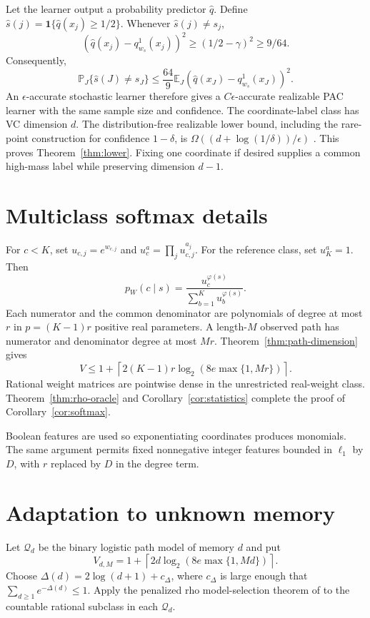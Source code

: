 \documentclass{article}
\theoremstyle{definition}
\theoremstyle{remark}
\newcommand{\E}{\mathbb E}
\newcommand{\Pp}{\mathbb P}
\newcommand{\cQ}{\mathcal Q}
\begin{document}
Let the learner output a probability predictor $\widehat q$. Define $\widehat s(j)=\mathbf 1\{\widehat q(x_j)\ge1/2\}$. Whenever $\widehat s(j)\ne s_j$,
\[
(\widehat q(x_j)-q_{w_s}^1(x_j))^2
\ge(1/2-\gamma)^2\ge9/64.
\]
Consequently,
\[
\Pp_J\{\widehat s(J)\ne s_J\}
\le\frac{64}{9}\E_J(\widehat q(x_J)-q_{w_s}^1(x_J))^2.
\]
An $\epsilon$-accurate stochastic learner therefore gives a $C\epsilon$-accurate realizable PAC learner with the same sample size and confidence. The coordinate-label class has VC dimension $d$. The distribution-free realizable lower bound, including the rare-point construction for confidence $1-\delta$, is $\Omega((d+\log(1/\delta))/\epsilon)$ \citep[Chapter 6]{shalev2014understanding}. This proves Theorem~\ref{thm:lower}. Fixing one coordinate if desired supplies a common high-mass label while preserving dimension $d-1$.

\section{Multiclass softmax details}
\label{app:softmax}

For $c<K$, set $u_{c,j}=e^{w_{c,j}}$ and $u_c^a=\prod_j u_{c,j}^{a_j}$. For the reference class, set $u_K^a=1$. Then
\[
p_W(c\mid s)=\frac{u_c^{\varphi(s)}}{\sum_{b=1}^K u_b^{\varphi(s)}}.
\]
Each numerator and the common denominator are polynomials of degree at most $r$ in $p=(K-1)r$ positive real parameters. A length-$M$ observed path has numerator and denominator degree at most $Mr$. Theorem~\ref{thm:path-dimension} gives
\[
V\le1+\left\lceil2(K-1)r\log_2(8e\max\{1,Mr\})\right\rceil.
\]
Rational weight matrices are pointwise dense in the unrestricted real-weight class. Theorem~\ref{thm:rho-oracle} and Corollary~\ref{cor:statistics} complete the proof of Corollary~\ref{cor:softmax}.

Boolean features are used so exponentiating coordinates produces monomials. The same argument permits fixed nonnegative integer features bounded in $\ell_1$ by $D$, with $r$ replaced by $D$ in the degree term.

\section{Adaptation to unknown memory}
\label{app:adaptation}

Let $\cQ_d$ be the binary logistic path model of memory $d$ and put
\[
V_{d,M}=1+\left\lceil2d\log_2(8e\max\{1,Md\})\right\rceil.
\]
Choose $\Delta(d)=2\log(d+1)+c_\Delta$, where $c_\Delta$ is large enough that $\sum_{d\ge1}e^{-\Delta(d)}\le1$. Apply the penalized rho model-selection theorem of \citet{baraud2018rho} to the countable rational subclass in each $\cQ_d$.
\end{document}
